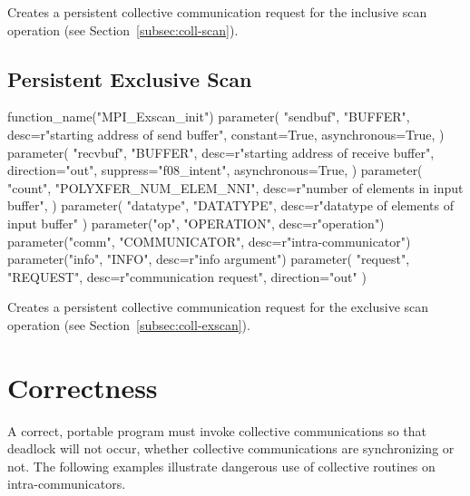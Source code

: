 Creates a persistent collective communication request for the inclusive scan operation
(see Section~\ref{subsec:coll-scan}).

\subsection{Persistent Exclusive Scan}
\label{subsec:pcoll-exscan}

%
\begin{mpi-binding}
    function_name("MPI_Exscan_init")
    parameter(
        "sendbuf",
        "BUFFER",
        desc=r"starting address of send buffer",
        constant=True,
        asynchronous=True,
    )
    parameter(
        "recvbuf",
        "BUFFER",
        desc=r"starting address of receive buffer",
        direction="out",
        suppress="f08_intent",
        asynchronous=True,
    )
    parameter(
        "count",
        "POLYXFER_NUM_ELEM_NNI",
        desc=r"number of elements in input buffer",
    )
    parameter(
        "datatype", "DATATYPE", desc=r"datatype of elements of input buffer"
    )
    parameter("op", "OPERATION", desc=r"operation")
    parameter("comm", "COMMUNICATOR", desc=r"intra-communicator")
    parameter("info", "INFO", desc=r"info argument")
    parameter(
        "request", "REQUEST", desc=r"communication request", direction="out"
    )
\end{mpi-binding}

Creates a persistent collective communication request for the exclusive scan operation
(see Section~\ref{subsec:coll-exscan}).

\section{Correctness}
\label{coll:correct}

A correct, portable program must invoke collective communications so
that deadlock will
not occur, whether collective communications are synchronizing or not.
The following examples illustrate dangerous use of collective routines
on intra-communicators.

